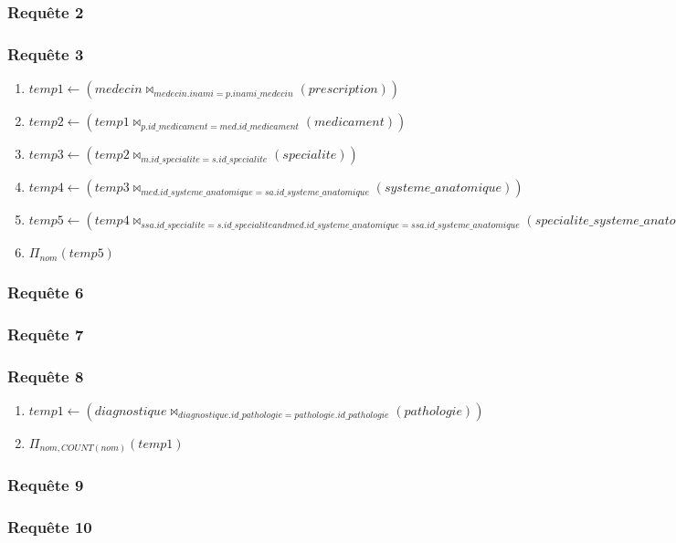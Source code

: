 \documentclass[utf8]{article}
\begin{document}
\subsubsection{Requête 2}

\subsubsection{Requête 3}
\begin{enumerate}
  \item $temp1 \leftarrow   (medecin \bowtie_{medecin.inami = p.inami\_medecin} (prescription))$
  \item $temp2 \leftarrow (temp1 \bowtie_{p.id\_medicament = med.id\_medicament}(medicament))$
  \item $temp3 \leftarrow (temp2 \bowtie_{m.id\_specialite = s.id\_specialite}(specialite))$
  \item $temp4 \leftarrow (temp3 \bowtie_{med.id\_systeme\_anatomique = sa.id\_systeme\_anatomique}(systeme\_anatomique))$
  \item $temp5 \leftarrow (temp4 \bowtie_{ssa.id\_specialite = s.id\_specialite and med.id\_systeme\_anatomique = ssa.id\_systeme\_anatomique}(specialite\_systeme\_anatomique))$
  \item $\Pi_{nom} (temp 5)$
\end{enumerate}

\subsubsection{Requête 6}
\subsubsection{Requête 7}
\subsubsection{Requête 8}
\begin{enumerate}
  \item $temp1 \leftarrow (diagnostique \bowtie_{diagnostique.id\_pathologie = pathologie.id\_pathologie}(pathologie))$
  \item $\Pi_{nom, COUNT(nom)} (temp1)$
\end{enumerate}

\subsubsection{Requête 9}
\subsubsection{Requête 10}

\section{}
\end{document}
